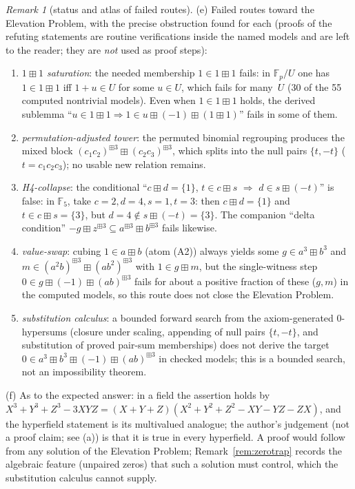 \documentclass[11pt]{article}
\theoremstyle{definition}
\theoremstyle{remark}
\newtheorem{remark}[theorem]{Remark}
\newcommand{\bp}{\boxplus}
\begin{document}
\begin{remark}[status and atlas of failed routes]
(e) Failed routes toward the Elevation Problem, with the precise
obstruction found for each (proofs of the refuting statements are
routine verifications inside the named models and are left to the
reader; they are \emph{not} used as proof steps):
\begin{enumerate}[label=\textup{(\roman*)}]
  \item \emph{$1\boxplus1$ saturation}: the needed membership $1\in
  1\bp1$ fails: in $\mathbb F_{p}/U$ one has $1\in1\bp1$ iff $1+u\in U$
  for some $u\in U$, which fails for many~$U$ (30 of the 55 computed
  nontrivial models). Even when $1\in1\bp1$ holds, the derived sublemma
  ``$u\in1\bp1\Rightarrow1\in u\bp(-1)\bp(1\bp1)$'' fails in some of
  them.
  \item \emph{permutation-adjusted tower}: the permuted
  binomial regrouping produces the mixed block
  $(c_{1}c_{2})^{\bp3}\bp(c_{2}c_{3})^{\bp3}$, which splits into the
  null pairs $\{t,-t\}$ ($t=c_{1}c_{2}c_{3}$); no usable new relation
  remains.
  \item \emph{H4-collapse}: the conditional ``$c\bp d=\{1\}$, $t\in
  c\bp s$ $\Rightarrow$ $d\in s\bp(-t)$'' is false: in $\mathbb F_{5}$,
  take $c=2,d=4,s=1,t=3$: then $c\bp d=\{1\}$ and $t\in c\bp s=\{3\}$,
  but $d=4\notin s\bp(-t)=\{3\}$. The companion ``delta condition'' $-g\bp
  z^{\bp3}\subseteq a^{\bp3}\bp b^{\bp3}$ fails likewise.
   \item \emph{value-swap}: cubing $1\in a\bp b$ (atom (A2)) always
   yields some $g\in a^{3}\bp b^{3}$ and $m\in
   (a^{2}b)^{\bp3}\bp(ab^{2})^{\bp3}$ with $1\in g\bp m$, but the
   single-witness step $0\in g\bp(-1)\bp(ab)^{\bp3}$ fails for about a
   positive fraction of these ($g,m$) in the computed models, so this route does not
   close the Elevation Problem.
  \item \emph{substitution calculus}: a bounded forward search from the
  axiom-generated $0$-hypersums (closure under scaling, appending of
  null pairs $\{t,-t\}$, and substitution of proved pair-sum
  memberships) does not derive the target $0\in
  a^{3}\bp b^{3}\bp(-1)\bp(ab)^{\bp3}$ in checked models; this is a
  bounded search, not an impossibility theorem.
\end{enumerate}

(f) As to the expected answer: in a field the assertion holds by
$X^3+Y^3+Z^3-3XYZ=(X+Y+Z)(X^2+Y^2+Z^2-XY-YZ-ZX)$, and the hyperfield
statement is its multivalued analogue; the author's judgement (not a
proof claim; see (a)) is that it is true in every hyperfield. A proof
would follow from any solution of the Elevation Problem;
Remark~\ref{rem:zerotrap} records the algebraic feature (unpaired
zeros) that such a solution must control, which the substitution
calculus cannot supply.
\end{remark}
\end{document}

